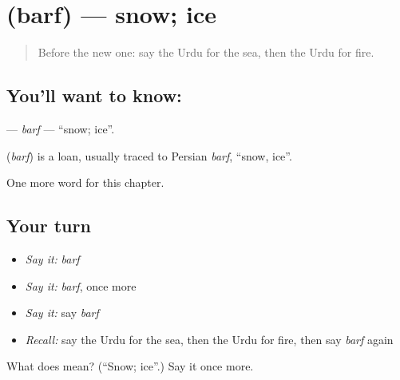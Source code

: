 \section[\texorpdfstring{\ur{برف} (barf)}{برف (barf)}]{ (barf) — snow; ice}

\label{lesson:UR-C66-barf}



\begin{quote}
Before the new one: say the Urdu for the sea, then the Urdu for fire.
\end{quote}

\subsection*{You'll want to know: }
\textbf{} — \emph{barf} — \textquotedblleft{}snow; ice\textquotedblright{}.

\begin{cousinweb}
\textbf{} (\emph{barf}) is a loan, usually traced to Persian \emph{barf}, \textquotedblleft{}snow, ice\textquotedblright{}.
\end{cousinweb}

\begin{grammarlens}[title={What you've built}]
One more word for this chapter.
\end{grammarlens}

\subsection*{Your turn}
\begin{itemize}
\raggedright
  \item \emph{Say it:} \emph{barf}
  \item \emph{Say it:} \emph{barf}, once more
  \item \emph{Say it:} say \emph{barf}
  \item \emph{Recall:} say the Urdu for the sea, then the Urdu for fire, then say \emph{barf} again
\end{itemize}

\begin{tcolorbox}[breakable,colback=teal!4,colframe=teal!35!black,title={Before you move on}]
What does  mean? (\textquotedblleft{}Snow; ice\textquotedblright{}.) Say it once more.
\end{tcolorbox}
